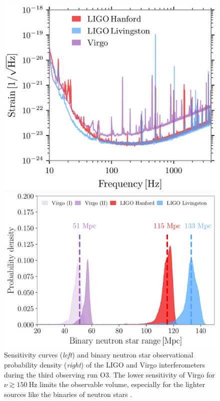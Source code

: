 \documentclass[a4paper,titlepage]{book}     	%
\begin{document}
\begin{figure}[h]
	\begin{minipage}{.47\textwidth}
		\centering
		\includegraphics[width=\textwidth]{./images/sensitivity.png}
	\end{minipage}
	\hfill
	\begin{minipage}{.53\textwidth}
		\centering
		\includegraphics[width=1.02\textwidth]{./images/O3BNSrange.png}	
	\end{minipage}
	\caption{Sensitivity curves (\emph{left}) and binary neutron star observational probability density (\emph{right}) of the LIGO and Virgo interferometers during the third observing run O3. The lower sensitivity of Virgo for $\nu \gtrsim 150~\text{Hz}$ limits the observable volume, especially for the lighter sources like the binaries of neutron stars \cite{GWTC-3}.}\label{fig:O3sensitivity}
\end{figure}
\end{document}
